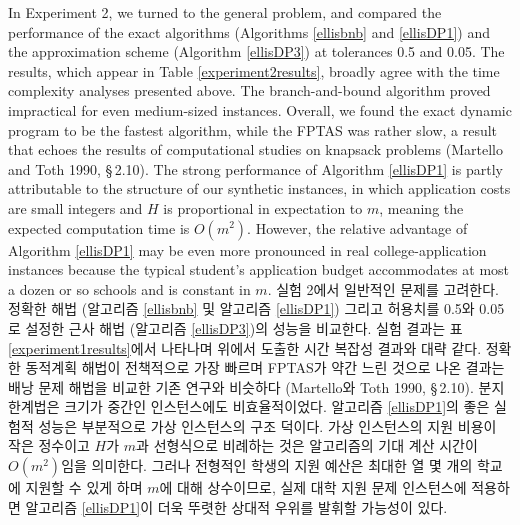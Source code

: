 \documentclass[11pt]{article} %
\theoremstyle{definition}
\theoremstyle{definition}
\begin{document}

\ifen
In Experiment 2, we turned to the general problem, and compared the performance of the exact algorithms (Algorithms \ref{ellisbnb} and \ref{ellisDP1}) and the approximation scheme (Algorithm \ref{ellisDP3}) at tolerances 0.5 and 0.05.  The results, which appear in Table \ref{experiment2results}, broadly agree with the time complexity analyses presented above. The branch-and-bound algorithm proved impractical for even medium-sized instances. Overall, we found the exact dynamic program to be the fastest algorithm, while the FPTAS was rather slow, a result that echoes the results of computational studies on knapsack problems (Martello and Toth 1990, \S\,2.10). The strong performance of Algorithm \ref{ellisDP1} is partly attributable to the structure of our synthetic instances, in which application costs are small integers and $H$ is proportional in expectation to $m$, meaning the expected computation time is $O(m^2)$. However, the relative advantage of Algorithm \ref{ellisDP1} may be even more pronounced in real college-application instances because the typical student's application budget accommodates at most a dozen or so schools and is constant in $m$. 
\else
실험 2에서 일반적인 문제를 고려한다. 정확한 해법 (알고리즘 \ref{ellisbnb} 및 알고리즘 \ref{ellisDP1}) 그리고 허용치를 0.5와 0.05로 설정한 근사 해법 (알고리즘 \ref{ellisDP3})의 성능을 비교한다. 실험 결과는 표 \ref{experiment1results}에서 나타나며 위에서 도출한 시간 복잡성 결과와 대략 같다. 정확한 동적계획 해법이 전책적으로 가장 빠르며 FPTAS가 약간 느린 것으로 나온 결과는 배낭 문제 해법을 비교한 기존 연구와 비슷하다 (Martello와 Toth 1990, \S\,2.10). 분지한계법은 크기가 중간인 인스턴스에도 비효율적이었다. 알고리즘 \ref{ellisDP1}의 좋은 실험적 성능은 부분적으로 가상 인스턴스의 구조 덕이다. 가상 인스턴스의 지원 비용이 작은 정수이고 $H$가 $m$과 선형식으로 비례하는 것은 알고리즘의 기대 계산 시간이 $O(m^2)$임을 의미한다. 그러나 전형적인 학생의 지원 예산은 최대한 열 몇 개의 학교에 지원할 수 있게 하며 $m$에 대해 상수이므로, 실제 대학 지원 문제 인스턴스에 적용하면 알고리즘 \ref{ellisDP1}이 더욱 뚜렷한 상대적 우위를 발휘할 가능성이 있다. 
\fi
\end{document}

